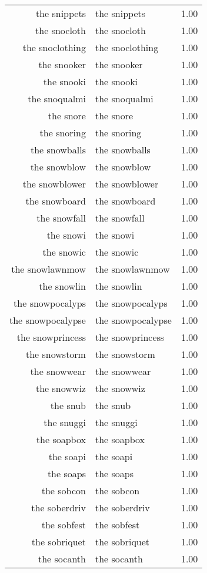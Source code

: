 \begin{table}[ht]
\begin{tabular}{rlr}
  the snippets & the snippets & 1.00 \\ 
  the snocloth & the snocloth & 1.00 \\ 
  the snoclothing & the snoclothing & 1.00 \\ 
  the snooker & the snooker & 1.00 \\ 
  the snooki & the snooki & 1.00 \\ 
  the snoqualmi & the snoqualmi & 1.00 \\ 
  the snore & the snore & 1.00 \\ 
  the snoring & the snoring & 1.00 \\ 
  the snowballs & the snowballs & 1.00 \\ 
  the snowblow & the snowblow & 1.00 \\ 
  the snowblower & the snowblower & 1.00 \\ 
  the snowboard & the snowboard & 1.00 \\ 
  the snowfall & the snowfall & 1.00 \\ 
  the snowi & the snowi & 1.00 \\ 
  the snowic & the snowic & 1.00 \\ 
  the snowlawnmow & the snowlawnmow & 1.00 \\ 
  the snowlin & the snowlin & 1.00 \\ 
  the snowpocalyps & the snowpocalyps & 1.00 \\ 
  the snowpocalypse & the snowpocalypse & 1.00 \\ 
  the snowprincess & the snowprincess & 1.00 \\ 
  the snowstorm & the snowstorm & 1.00 \\ 
  the snowwear & the snowwear & 1.00 \\ 
  the snowwiz & the snowwiz & 1.00 \\ 
  the snub & the snub & 1.00 \\ 
  the snuggi & the snuggi & 1.00 \\ 
  the soapbox & the soapbox & 1.00 \\ 
  the soapi & the soapi & 1.00 \\ 
  the soaps & the soaps & 1.00 \\ 
  the sobcon & the sobcon & 1.00 \\ 
  the soberdriv & the soberdriv & 1.00 \\ 
  the sobfest & the sobfest & 1.00 \\ 
  the sobriquet & the sobriquet & 1.00 \\ 
  the socanth & the socanth & 1.00 \\ 

\end{tabular}
\end{table}
